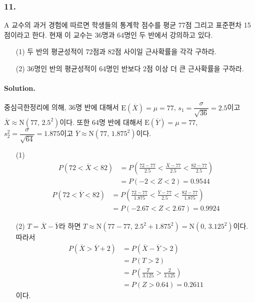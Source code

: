 \subsubsection{11.} A 교수의 과거 경험에 따르면 학생들의 통계학 점수를 평균 77점 그리고 표준편차 15점이라고 한다.
현재 이 교수는 36명과 64명인 두 반에서 강의하고 있다.

\begin{itemize}
    \item[(1)] 두 반의 평균성적이 72점과 82점 사이일 근사확률을 각각 구하라.
    \item[(2)] 36명인 반의 평균성적이 64명인 반보다 2점 이상 더 큰 근사확률을 구하라. 
\end{itemize}

\paragraph{Solution.} 중심극한정리에 의해, 36명 반에 대해서 $\mathrm{E}\left(\overline{X}\right)=\mu=77$, $s_1=\dfrac{\sigma}{\sqrt{36}}=2.5$이고
$\overline{X} \approx \mathrm{N}\left(77,\,2.5^2\right)$이다. 또한 64명 반에 대해서
$\mathrm{E}\left(\overline{Y}\right)=\mu=77$, $s_2^2=\dfrac{\sigma}{\sqrt{64}}=1.875$이고
$\overline{Y} \approx \mathrm{N}\left(77,\,1.875^2\right)$이다.

\begin{itemize}
    \item[(1)] {
        \begin{align*}
            P\left(72<\overline{X}<82\right)&=P\left(\frac{72-77}{2.5}<\frac{\overline{X}-77}{2.5}<\frac{82-77}{2.5}\right) \\
            &=P\left(-2<Z<2\right) = 0.9544
        \end{align*}
        \begin{align*}
            P\left(72<\overline{Y}<82\right)&=P\left(\frac{72-77}{1.875}<\frac{\overline{Y}-77}{2.5}<\frac{82-77}{1.875}\right) \\
            &=P\left(-2.67<Z<2.67\right) = 0.9924
        \end{align*}
    }
    \item[(2)] {
        $T=\overline{X}-\overline{Y}$라 하면 $T \approx \mathrm{N}\left(77-77,\,2.5^2+1.875^2\right)=\mathrm{N}\left(0,\,3.125^2\right)$이다. 따라서
        \begin{align*}
            P\left(\overline{X}>\overline{Y}+2\right) &= P\left(\overline{X}-\overline{Y}>2\right) \\ 
            &= P\left(T>2\right) \\ 
            &= P\left(\frac{T}{3.125}>\frac{2}{3.125}\right) \\
            &= P\left(Z>0.64\right) = 0.2611
        \end{align*}
        이다.
    }
\end{itemize}

